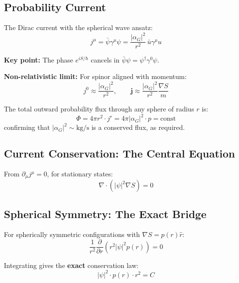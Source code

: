 \documentclass[11pt,a4paper]{article}
\theoremstyle{definition}
\theoremstyle{remark}
\begin{document}
	\subsection{Probability Current}
	
	The Dirac current with the spherical wave ansatz:
	\begin{equation}
		j^\mu = \bar{\psi}\gamma^\mu\psi = \frac{|\alpha_G|^2}{r^2}\,\bar{u}\gamma^\mu u
		\label{eq:current}
	\end{equation}
	
	\textbf{Key point:} The phase $e^{iS/\hbar}$ cancels in $\bar{\psi}\psi = \psi^\dagger\gamma^0\psi$.
	
	\textbf{Non-relativistic limit:} For spinor aligned with momentum:
	\begin{equation}
		j^0 \approx \frac{|\alpha_G|^2}{r^2}, \qquad \mathbf{j} \approx \frac{|\alpha_G|^2}{r^2}\frac{\nabla S}{m}
		\label{eq:current_NR}
	\end{equation}
	
	The total outward probability flux through any sphere of radius $r$ is:
	\begin{equation}
		\Phi = 4\pi r^2 \cdot j^r = 4\pi|\alpha_G|^2 \cdot p = \text{const}
	\end{equation}
	confirming that $|\alpha_G|^2 \sim \text{kg/s}$ is a conserved flux, as required.
	
	\subsection{Current Conservation: The Central Equation}
	
	From $\partial_\mu j^\mu = 0$, for stationary states:
	\begin{equation}
		\boxed{\nabla\cdot\!\left(|\psi|^2\nabla S\right) = 0}
		\label{eq:continuity}
	\end{equation}
	
	\subsection{Spherical Symmetry: The Exact Bridge}
	
	For spherically symmetric configurations with $\nabla S = p(r)\hat{r}$:
	\begin{equation}
		\frac{1}{r^2}\frac{\partial}{\partial r}\!\left(r^2|\psi|^2 p(r)\right) = 0
	\end{equation}
	
	Integrating gives the \textbf{exact} conservation law:
	\begin{equation}
		\boxed{|\psi|^2 \cdot p(r) \cdot r^2 = C}
		\label{eq:exact_bridge}
	\end{equation}
	
\end{document}
